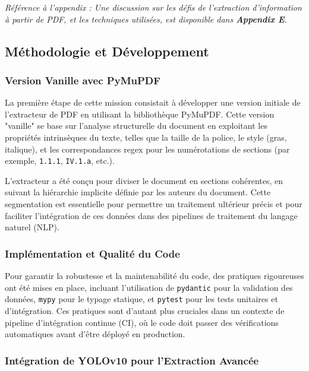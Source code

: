 \documentclass[13pt,a4paper]{article}
\begin{document}
\textit{Référence à l'appendix : Une discussion sur les défis de l'extraction d'information à partir de PDF, et les techniques utilisées, est disponible dans \textbf{Appendix E}.}

\subsection{Méthodologie et Développement}

\subsubsection{\normalsize{Version Vanille avec PyMuPDF}}

La première étape de cette mission consistait à développer une version initiale de l'extracteur de PDF en utilisant la bibliothèque PyMuPDF. Cette version "vanille" se base sur l'analyse structurelle du document en exploitant les propriétés intrinsèques du texte, telles que la taille de la police, le style (gras, italique), et les correspondances regex pour les numérotations de sections (par exemple, \texttt{1.1.1}, \texttt{IV.1.a}, etc.).

L'extracteur a été conçu pour diviser le document en sections cohérentes, en suivant la hiérarchie implicite définie par les auteurs du document. Cette segmentation est essentielle pour permettre un traitement ultérieur précis et pour faciliter l'intégration de ces données dans des pipelines de traitement du langage naturel (NLP).


\subsubsection{\normalsize Implémentation et Qualité du Code}

Pour garantir la robustesse et la maintenabilité du code, des pratiques rigoureuses ont été mises en place, incluant l'utilisation de \texttt{pydantic} pour la validation des données, \texttt{mypy} pour le typage statique, et \texttt{pytest} pour les tests unitaires et d'intégration. Ces pratiques sont d'autant plus cruciales dans un contexte de pipeline d'intégration continue (CI), où le code doit passer des vérifications automatiques avant d'être déployé en production.


\subsubsection{\normalsize Intégration de YOLOv10 pour l'Extraction Avancée}
\end{document}
